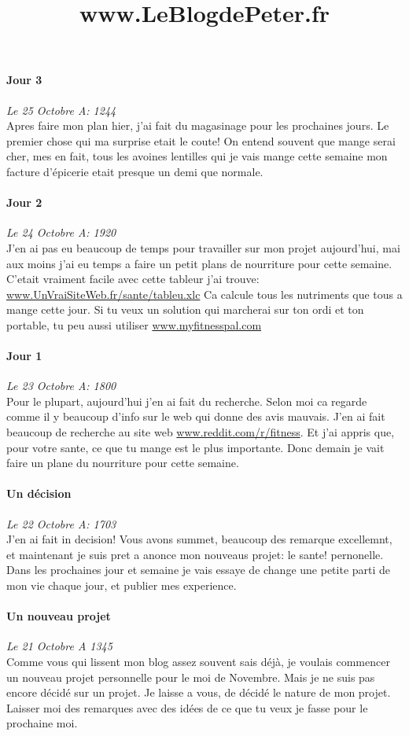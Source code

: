 \documentclass{article}
\begin{document}
\title{www.LeBlogdePeter.fr}


\paragraph{Jour 3} \emph{Le 25 Octobre A: 1244}\\
Apres faire mon plan hier, j'ai fait du magasinage pour les prochaines jours. Le premier chose qui ma surprise etait le coute! On entend souvent
que mange serai cher, mes en fait, tous les avoines lentilles qui je vais mange cette semaine mon facture d'épicerie etait presque un demi 
que normale.

\paragraph{Jour 2} \emph{Le 24 Octobre A: 1920}\\
J'en ai pas eu beaucoup de temps pour travailler sur mon projet aujourd'hui, mai aux moins j'ai eu temps a faire un petit plans de nourriture
pour cette semaine. C'etait vraiment facile avec cette tableur j'ai trouve: \underline{www.UnVraiSiteWeb.fr/sante/tableu.xlc} Ca calcule 
tous les nutriments que tous a mange cette jour. Si tu veux un solution qui marcherai sur ton ordi et ton portable, tu peu aussi utiliser 
\underline{www.myfitnesspal.com}

\paragraph{Jour 1} \emph{Le 23 Octobre A: 1800}\\
Pour le plupart, aujourd'hui j'en ai fait du recherche. Selon moi ca regarde comme il y beaucoup d'info sur le web qui donne des avis mauvais.
J'en ai fait beaucoup de recherche au site web \underline{www.reddit.com/r/fitness}. Et j'ai appris que, pour votre sante, ce que tu mange est
le plus importante. Donc demain je vait faire un plane du nourriture pour cette semaine.

\paragraph{Un décision} \emph{Le 22 Octobre A: 1703}\\
J'en ai fait in decision!  Vous avons summet, beaucoup des remarque excellemnt, et maintenant je suis pret a anonce mon nouveaus projet: le sante!  pernonelle. Dans les prochaines jour et semaine je vais essaye de change une petite parti de mon vie chaque jour, et publier mes experience.

\paragraph{Un nouveau projet} \emph{Le 21 Octobre A 1345} \\
Comme vous qui lissent mon blog assez souvent sais déjà, je voulais commencer un nouveau projet personnelle pour le moi de Novembre. Mais je ne suis pas encore décidé sur un projet. Je laisse a vous, de décidé le nature de mon projet. Laisser moi des remarques avec des idées de ce que tu veux je fasse pour le prochaine moi.
\end{document}
